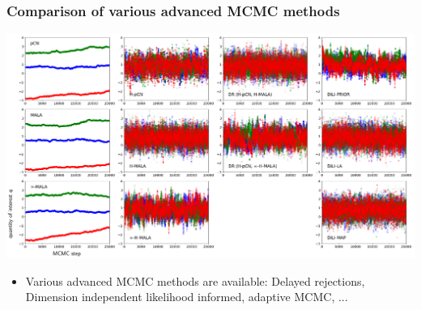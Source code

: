 \documentclass{beamer}
\begin{document}
\begin{frame}[c]
  \frametitle{Comparison of various advanced MCMC methods}

  \begin{center}
    \includegraphics[width=\textwidth]{./figures/ex1_mcmc_trace.pdf}
  \end{center}

  \begin{itemize}
    \item Various advanced MCMC methods are available: Delayed rejections,
      Dimension independent likelihood informed, adaptive MCMC, ...
  \end{itemize}
\end{frame}
\end{document}
